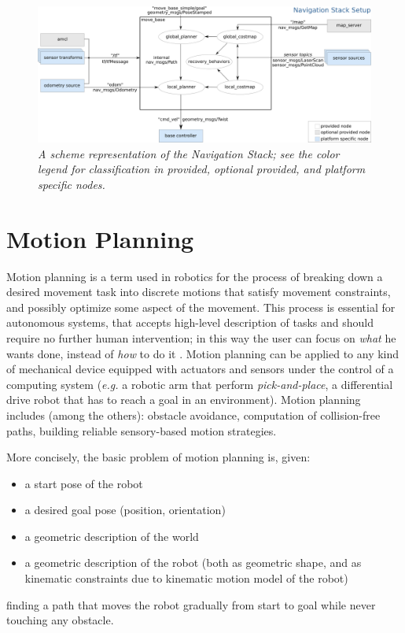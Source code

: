 \begin{figure}
	\centering
	\includegraphics[width=1.1\textwidth]{Images/background_and_tools/navigationStack.png}
	\caption{\textit{A scheme representation of the Navigation Stack; see the color legend for classification in provided, optional provided, and platform specific nodes.}}
	\label{fig:navStack}
\end{figure}


\section{Motion Planning}\label{sec:motionPlanning}

Motion planning is a term used in robotics for the process of breaking down a desired movement task into discrete motions that satisfy movement constraints, and possibly optimize some aspect of the movement. This process is essential for autonomous systems, that accepts high-level description of tasks and should require no further human intervention; in this way the user can focus on \textit{what} he wants done, instead of \textit{how} to do it \parencite{motionPlanning}. Motion planning can be applied to any kind of mechanical device equipped with actuators and sensors under the control of a computing system (\textit{e.g.} a robotic arm that perform \textit{pick-and-place}, a differential drive robot that has to reach a goal in an environment). Motion planning includes (among the others): obstacle avoidance, computation of collision-free paths, building reliable sensory-based motion strategies.

More concisely, the basic problem of motion planning is, given:
\begin{itemize}
	\item a start pose of the robot
	\item a desired goal pose (position, orientation)
	\item a geometric description of the world
	\item a geometric description of the robot (both as geometric shape, and as kinematic constraints due to kinematic motion model of the robot)
\end{itemize}
finding a path that moves the robot gradually from start to goal while never touching any obstacle.

